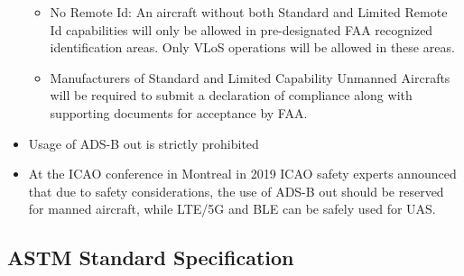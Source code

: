 \documentclass{ua_wgs_base}
\begin{document}
\begin{itemize}
\begin{itemize}
\item No Remote Id: An aircraft without both Standard and Limited Remote
Id capabilities will only be allowed in pre-designated FAA recognized
identification areas. Only VLoS operations will be allowed in these
areas.
\item Manufacturers of Standard and Limited Capability Unmanned Aircrafts
will be required to submit a declaration of compliance along with
supporting documents for acceptance by FAA. 
\end{itemize}
\item Usage of ADS-B out is strictly prohibited
\item At the ICAO conference in Montreal in 2019 ICAO safety experts announced
that due to safety considerations, the use of ADS-B out should be
reserved for manned aircraft, while LTE/5G and BLE can be safely used
for UAS.
\end{itemize}

\subsection{ASTM Standard Specification}
\end{document}
